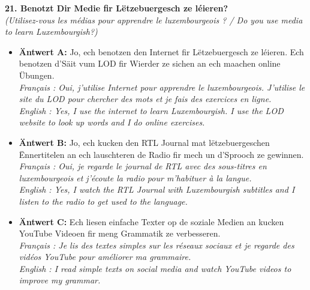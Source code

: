 \noindent\textbf{21. Benotzt Dir Medie fir Lëtzebuergesch ze léieren?}\\
\textit{(Utilisez-vous les médias pour apprendre le luxembourgeois ? / Do you use media to learn Luxembourgish?)}
\begin{itemize}
    \item \textbf{Äntwert A:} Jo, ech benotzen den Internet fir Lëtzebuergesch ze léieren. Ech benotzen d'Säit vum LOD fir Wierder ze sichen an ech maachen online Übungen.\\
    \textit{Français : Oui, j'utilise Internet pour apprendre le luxembourgeois. J'utilise le site du LOD pour chercher des mots et je fais des exercices en ligne.}\\
    \textit{English : Yes, I use the internet to learn Luxembourgish. I use the LOD website to look up words and I do online exercises.}
    \item \textbf{Äntwert B:} Jo, ech kucken den RTL Journal mat lëtzebuergeschen Ënnertitelen an ech lauschteren de Radio fir mech un d'Sprooch ze gewinnen.\\
    \textit{Français : Oui, je regarde le journal de RTL avec des sous-titres en luxembourgeois et j'écoute la radio pour m'habituer à la langue.}\\
    \textit{English : Yes, I watch the RTL Journal with Luxembourgish subtitles and I listen to the radio to get used to the language.}
    \item \textbf{Äntwert C:} Ech liesen einfache Texter op de soziale Medien an kucken YouTube Videoen fir meng Grammatik ze verbesseren.\\
    \textit{Français : Je lis des textes simples sur les réseaux sociaux et je regarde des vidéos YouTube pour améliorer ma grammaire.}\\
    \textit{English : I read simple texts on social media and watch YouTube videos to improve my grammar.}
\end{itemize}
\vspace{0.5em}

